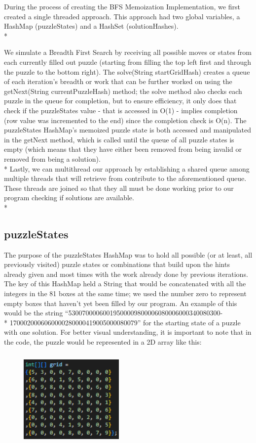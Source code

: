\documentclass[conference]{IEEEtran}
\begin{document}
During the process of creating the BFS Memoization Implementation, we first created a single threaded approach. This approach had two global variables, a HashMap (puzzleStates) and a HashSet (solutionHashes).
\\*

We simulate a Breadth First Search by receiving all possible moves or states from each currently filled out puzzle (starting from filling the top left first and through the puzzle to the bottom right). The solve(String startGridHash) creates a queue of each iteration's breadth or work that can be further worked on using the getNext(String currentPuzzleHash) method; the solve method also checks each puzzle in the queue for completion, but to ensure efficiency, it only does that check if the puzzleStates value - that is accessed in O(1) - implies completion (row value was incremented to the end) since the completion check is O(n). The puzzleStates HashMap’s memoized puzzle state is both accessed and manipulated in the getNext method, which is called until the queue of all puzzle states is empty (which means that they have either been removed from being invalid or removed from being a solution).
\\*
Lastly, we can multithread our approach by establishing a shared queue among multiple threads that will retrieve from contribute to the aforementioned queue. These threads are joined so that they all must be done working prior to our program checking if solutions are available.
\\*

\subsection{puzzleStates}
The purpose of the puzzleStates HashMap was to hold all possible (or at least, all previously visited) puzzle states or combinations that build upon the hints already given and most times with the work already done by previous iterations. The key of this HashMap held a String that would be concatenated with all the integers in the 81 boxes at the same time; we used the number zero to represent empty boxes that haven’t yet been filled by our program. An example of this would be the string “53007000060019500009800006080006000340080300-
\\*
1700020006060000280000419005000080079” for the starting state of a puzzle with one solution. For better visual understanding, it is important to note that in the code, the puzzle would be represented in a 2D array like this:
\vspace{1\baselineskip}
\begin{figure}[H]
\centering
\includegraphics[width=5.11cm,height=4.87cm]{one_solution_puzzle.png}
\end{figure}
\end{document}

